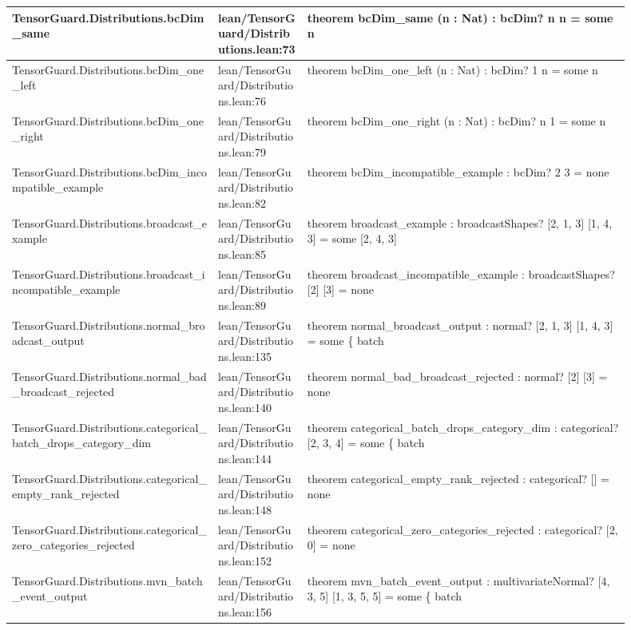 \documentclass[10pt]{article}
\begin{document}
\begin{longtable}{|p{0.30\linewidth}|p{0.13\linewidth}|p{0.47\linewidth}|}
\hline
TensorGuard.Distributions.bcDim\_same & lean/TensorGuard/Distributions.lean:73 & theorem bcDim\_same (n : Nat) : bcDim? n n = some n \\
\hline
TensorGuard.Distributions.bcDim\_one\_left & lean/TensorGuard/Distributions.lean:76 & theorem bcDim\_one\_left (n : Nat) : bcDim? 1 n = some n \\
\hline
TensorGuard.Distributions.bcDim\_one\_right & lean/TensorGuard/Distributions.lean:79 & theorem bcDim\_one\_right (n : Nat) : bcDim? n 1 = some n \\
\hline
TensorGuard.Distributions.bcDim\_incompatible\_example & lean/TensorGuard/Distributions.lean:82 & theorem bcDim\_incompatible\_example : bcDim? 2 3 = none \\
\hline
TensorGuard.Distributions.broadcast\_example & lean/TensorGuard/Distributions.lean:85 & theorem broadcast\_example : broadcastShapes? [2, 1, 3] [1, 4, 3] = some [2, 4, 3] \\
\hline
TensorGuard.Distributions.broadcast\_incompatible\_example & lean/TensorGuard/Distributions.lean:89 & theorem broadcast\_incompatible\_example : broadcastShapes? [2] [3] = none \\
\hline
TensorGuard.Distributions.normal\_broadcast\_output & lean/TensorGuard/Distributions.lean:135 & theorem normal\_broadcast\_output : normal? [2, 1, 3] [1, 4, 3] = some \{ batch \\
\hline
TensorGuard.Distributions.normal\_bad\_broadcast\_rejected & lean/TensorGuard/Distributions.lean:140 & theorem normal\_bad\_broadcast\_rejected : normal? [2] [3] = none \\
\hline
TensorGuard.Distributions.categorical\_batch\_drops\_category\_dim & lean/TensorGuard/Distributions.lean:144 & theorem categorical\_batch\_drops\_category\_dim : categorical? [2, 3, 4] = some \{ batch \\
\hline
TensorGuard.Distributions.categorical\_empty\_rank\_rejected & lean/TensorGuard/Distributions.lean:148 & theorem categorical\_empty\_rank\_rejected : categorical? [] = none \\
\hline
TensorGuard.Distributions.categorical\_zero\_categories\_rejected & lean/TensorGuard/Distributions.lean:152 & theorem categorical\_zero\_categories\_rejected : categorical? [2, 0] = none \\
\hline
TensorGuard.Distributions.mvn\_batch\_event\_output & lean/TensorGuard/Distributions.lean:156 & theorem mvn\_batch\_event\_output : multivariateNormal? [4, 3, 5] [1, 3, 5, 5] = some \{ batch \\

\end{longtable}
\end{document}
